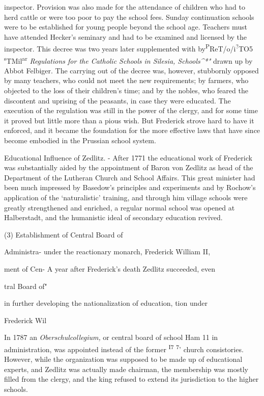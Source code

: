 \documentclass[]{book}
\begin{document}
inspector. Provision was also made for the attendance of children who had to herd cattle or were too poor to pay the school fees. Sunday continuation schools were to be established for young people beyond the school age. Teachers must have attended Hecker's seminary and had to be examined and licensed by the inspector. This decree was two years later supplemented with by\textsuperscript{P}ReT/o/i\textsuperscript{?}TO5 \textsuperscript{s}TMil\textsuperscript{ar} \emph{Regulations for the Catholic Schools in Silesia, Schools\^{}*"} drawn up by Abbot Felbiger. The carrying out of the decree was, however, stubbornly opposed by many teachers, who could not meet the new requirements; by farmers, who objected to the loss of their children's time; and by the nobles, who feared the discontent and uprising of the peasants, in case they were educated. The execution of the regulation was still in the power of the clergy, and for some time it proved but little more than a pious wish. But Frederick strove hard to have it enforced, and it became the foundation for the more effective laws that have since become embodied in the Prussian school system.

Educational Influence of Zedlitz. - After 1771 the educational work of Frederick was substantially aided by the appointment of Baron von Zedlitz as head of the Department of the Lutheran Church and School Affairs. This great minister had been much impressed by Basedow's principles and experiments and by Rochow's application of the `naturalistic' training, and through him village schools were greatly strengthened and enriched, a regular normal school was opened at Halberstadt, and the humanistic ideal of secondary education revived.

(3) Establishment of Central Board of

Administra- under the reactionary monarch, Frederick William II,

ment of Cen- A year after Frederick's death Zedlitz succeeded, even

tral Board of"

in further developing the nationalization of education, tion under

Frederick Wil

In 1787 an \emph{Oberschulcollegium,} or central board of school Ham 11 in administration, was appointed instead of the former \textsuperscript{I7} \textsuperscript{7}' church consistories. However, while the organization was supposed to be made up of educational experts, and Zedlitz was actually made chairman, the membership was mostly filled from the clergy, and the king refused to extend its jurisdiction to the higher schools.
\end{document}
